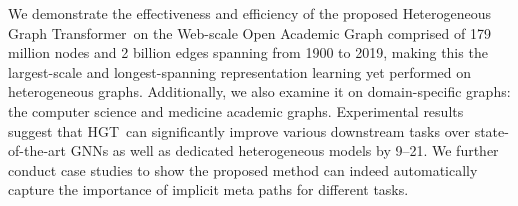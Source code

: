 \documentclass[sigconf]{acmart}
\theoremstyle{definition}
\newcommand{\model}{Heterogeneous Graph Transformer}
\newcommand{\short}{HGT}
\begin{document}
We demonstrate the effectiveness and efficiency of the proposed \model\ on the Web-scale Open Academic Graph comprised of 179 million nodes and 2 billion edges spanning from 1900 to 2019, making this the largest-scale
and longest-spanning representation learning yet performed on heterogeneous graphs. 
Additionally, we also examine it on domain-specific graphs: the computer science and medicine academic graphs. 
Experimental results suggest that \short\ can significantly improve various downstream tasks over state-of-the-art GNNs as well as dedicated heterogeneous models by 9--21. 
We further conduct case studies to show the proposed method can indeed  automatically capture the importance of implicit meta paths for different tasks. 



 
\end{document}
